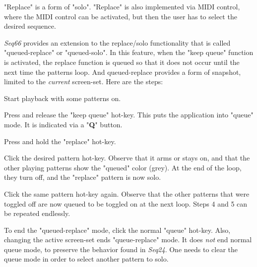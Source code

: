    "Replace" is a form of "solo".
   "Replace" is also implemented via MIDI control,
   where the MIDI control can be activated, but then the user has to select
   the desired sequence.  

   \textsl{Seq66} provides an extension to the replace/solo functionality
   that is called "queued-replace" or "queued-solo".  In this feature, when
   the "keep queue" function is activated, the replace function is queued so
   that it does not occur until the next time the patterns loop.
   And queued-replace provides a form of snapshot, limited to the
   \textsl{current} screen-set.
   Here are the steps:

   \begin{enumber}
      \item Start playback with some patterns on. 
      \item Press and release
         the "keep queue" hot-key.  This puts the application into "queue" mode.
         It is indicated via a "\textbf{Q}" button.
      \item Press and hold the "replace" hot-key.
      \item Click the desired pattern hot-key.  Observe that it arms or
         stays on, and that the other playing patterns show the "queued" color
         (grey).  At the end of the loop, they turn off, and the "replace"
         pattern is now solo.
      \item Click the same pattern hot-key again.  Observe that the other
         patterns that were toggled off are now queued to be toggled on at the
         next loop.  Steps 4 and 5 can be repeated endlessly.
      \item To end
         the "queued-replace" mode, click the normal "queue"
         hot-key.  Also, changing the active screen-set ends "queue-replace"
         mode.  It does \textsl{not} end normal queue mode, to preserve the
         behavior found in \textsl{Seq24}.
         One needs to clear the queue mode in order to select another pattern
         to solo.
   \end{enumber}


